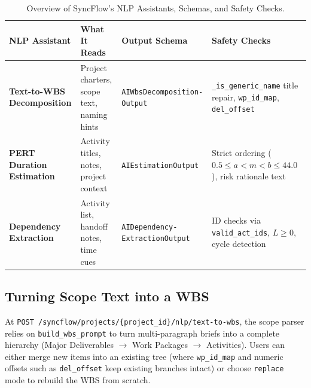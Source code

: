 \begin{table}[H]
\centering
\small
\setlength{\tabcolsep}{4.5pt}
\renewcommand{\arraystretch}{1.28}
\caption*{Overview of SyncFlow's NLP Assistants, Schemas, and Safety Checks.}
\vspace{-2pt}
\begin{tabularx}{\textwidth}{>{\raggedright\arraybackslash}p{2.7cm} >{\raggedright\arraybackslash}p{3.6cm} >{\raggedright\arraybackslash}p{3.5cm} >{\raggedright\arraybackslash}X}
\toprule
\textbf{NLP Assistant} & \textbf{What It Reads} & \textbf{Output Schema} & \textbf{Safety Checks} \\
\midrule
\textbf{Text-to-WBS Decomposition} & Project charters, scope text, naming hints & \texttt{AIWbsDecomposition-\allowbreak Output} & \texttt{\_is\_\allowbreak generic\_\allowbreak name} title repair, \texttt{wp\_id\_map}, \texttt{del\_offset} \\
\textbf{PERT Duration Estimation} & Activity titles, notes, project context & \texttt{AIEstimationOutput} & Strict ordering ($0.5 \le a < m < b \le 44.0$), risk rationale text \\
\textbf{Dependency Extraction} & Activity list, handoff notes, time cues & \texttt{AIDependency-\allowbreak ExtractionOutput} & ID checks via \texttt{valid\_\allowbreak act\_\allowbreak ids}, $L \ge 0$, cycle detection \\
\bottomrule
\end{tabularx}
\end{table}

\vspace{4mm}

\subsection{Turning Scope Text into a WBS}
At \texttt{POST /syncflow/\allowbreak projects/\allowbreak \{project\_id\}/\allowbreak nlp/\allowbreak text-\allowbreak to-\allowbreak wbs}, the scope parser relies on \texttt{build\_\allowbreak wbs\_\allowbreak prompt} to turn multi-paragraph briefs into a complete hierarchy (Major Deliverables $\to$ Work Packages $\to$ Activities). Users can either merge new items into an existing tree (where \texttt{wp\_\allowbreak id\_\allowbreak map} and numeric offsets such as \texttt{del\_offset} keep existing branches intact) or choose \texttt{replace} mode to rebuild the WBS from scratch.

\vspace{4mm}

